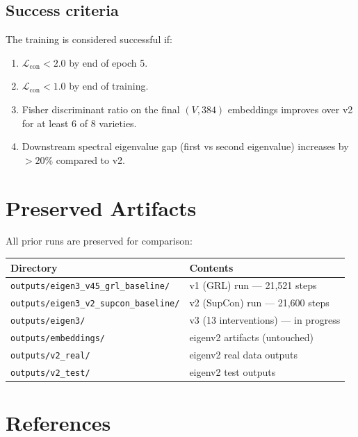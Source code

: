 \documentclass[11pt,a4paper]{article}
\newcommand{\loss}{\mathcal{L}}
\begin{document}
\subsection{Success criteria}

The training is considered successful if:
\begin{enumerate}
\item $\loss_{\text{con}} < 2.0$ by end of epoch 5.
\item $\loss_{\text{con}} < 1.0$ by end of training.
\item Fisher discriminant ratio on the final $(V, 384)$ embeddings improves
over v2 for at least 6 of 8 varieties.
\item Downstream spectral eigenvalue gap (first vs second eigenvalue)
increases by $> 20\%$ compared to v2.
\end{enumerate}

\section{Preserved Artifacts}

All prior runs are preserved for comparison:

\begin{center}
\begin{tabular}{ll}
\toprule
\textbf{Directory} & \textbf{Contents} \\
\midrule
\texttt{outputs/eigen3\_v45\_grl\_baseline/} & v1 (GRL) run --- 21{,}521 steps \\
\texttt{outputs/eigen3\_v2\_supcon\_baseline/} & v2 (SupCon) run --- 21{,}600 steps \\
\texttt{outputs/eigen3/} & v3 (13 interventions) --- in progress \\
\texttt{outputs/embeddings/} & eigenv2 artifacts (untouched) \\
\texttt{outputs/v2\_real/} & eigenv2 real data outputs \\
\texttt{outputs/v2\_test/} & eigenv2 test outputs \\
\bottomrule
\end{tabular}
\end{center}

\section{References}
\end{document}
